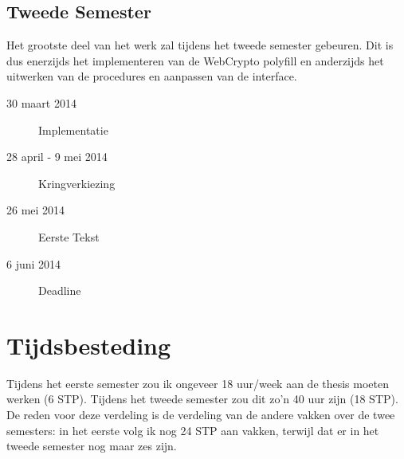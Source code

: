 \documentclass[a4paper]{article}
\begin{document}
\subsection*{Tweede Semester}

Het grootste deel van het werk zal tijdens het tweede semester gebeuren. Dit is dus enerzijds het implementeren van de WebCrypto polyfill en anderzijds het uitwerken van de procedures en aanpassen van de interface.

\begin{description}
    \item[30 maart 2014] Implementatie
    \item[28 april - 9 mei 2014] Kringverkiezing
    \item[26 mei 2014] Eerste Tekst
    \item[6 juni 2014] Deadline
\end{description}

\section*{Tijdsbesteding}

Tijdens het eerste semester zou ik ongeveer 18 uur/week aan de thesis moeten werken (6 STP). Tijdens het tweede semester zou dit zo'n 40 uur zijn (18 STP). De reden voor deze verdeling is de verdeling van de andere vakken over de twee semesters: in het eerste volg ik nog 24 STP aan vakken, terwijl dat er in het tweede semester nog maar zes zijn.
\end{document}
